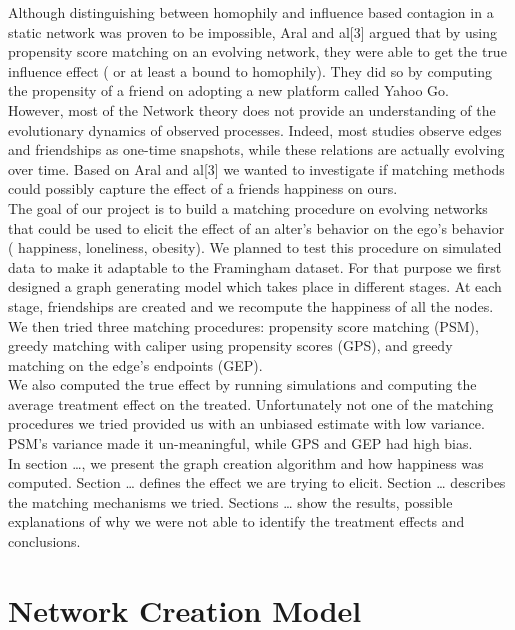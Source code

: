 \documentclass[11pt]{article}
\begin{document}
Although distinguishing between homophily and influence based contagion in a static network was proven to be impossible, Aral and al[3] argued that by using propensity score matching on an evolving network, they were able to get the true influence effect ( or at least a bound to homophily). They did so by computing the propensity of a friend on adopting a new platform called Yahoo Go.\\

However, most of the Network theory does not provide an understanding of the evolutionary dynamics of observed processes. Indeed, most studies observe edges and friendships as one-time snapshots, while these relations are actually evolving over time. Based on  Aral and al[3] we wanted to investigate if matching methods could possibly capture the effect of a friends happiness on ours.\\

The goal of our project is to build a matching procedure on evolving networks that could be used to elicit the effect of an alter’s behavior on the ego’s behavior ( happiness, loneliness, obesity). We planned to test this procedure on simulated data to make it adaptable to the Framingham dataset. For that purpose we first designed a graph generating model which takes place in different stages. At each stage, friendships are created and we recompute the happiness of all the nodes. We then tried three matching procedures: propensity score matching (PSM), greedy matching with caliper using propensity scores (GPS), and greedy matching on the edge’s endpoints (GEP).\\

We also computed the true effect by running simulations and computing the average treatment effect on the treated. Unfortunately not one of the matching procedures we tried provided us with an unbiased estimate with low variance. PSM’s variance made it un-meaningful, while GPS and GEP had high bias.\\

In  section …, we present the graph creation algorithm and how happiness was computed. Section … defines the effect we are trying to elicit. Section … describes the matching mechanisms we tried. Sections … show the results, possible explanations of why we were not able to identify the treatment effects and conclusions.\\

\section{Network Creation Model}
\end{document}
